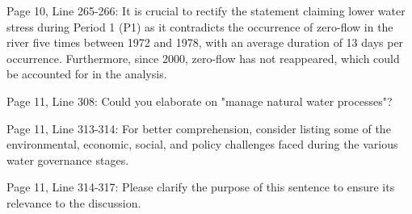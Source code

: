 Page 10, Line 265-266: It is crucial to rectify the statement claiming lower water stress during Period 1 (P1) as it contradicts the occurrence of zero-flow in the river five times between 1972 and 1978, with an average duration of 13 days per occurrence. Furthermore, since 2000, zero-flow has not reappeared, which could be accounted for in the analysis.

Page 11, Line 308: Could you elaborate on "manage natural water processes"?

Page 11, Line 313-314: For better comprehension, consider listing some of the environmental, economic, social, and policy challenges faced during the various water governance stages.

Page 11, Line 314-317: Please clarify the purpose of this sentence to ensure its relevance to the discussion.
